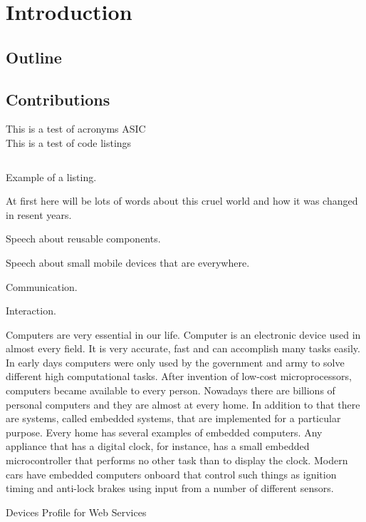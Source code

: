 \newpage
\section{Introduction}
\subsection{Outline}
\subsection{Contributions}



This is a test of acronyms  \gls{ASIC} \\

This is a test of code listings
\begin{listing}[H]
	\inputminted[linenos=true,
	fistline=32,
	firstnumber=32,
	lastline=60]{java}{../source/CoffeeMachineViaBlueTooth.java}
	\caption{Example of a listing.}
	\label{lst:example}
\end{listing}


At first here will be lots of words about this cruel world and how it was
changed in resent years.

Speech about reusable components.

Speech about small mobile devices that are everywhere.



Communication.

Interaction.





Computers are very essential in our life. Computer is an electronic device
used in almost every field. It is very accurate, fast and can accomplish
many tasks easily. In early days computers were only used by the government
and army to solve different high computational tasks. After invention of
low-cost microprocessors, computers became available to every person. Nowadays  
there are billions of personal computers and they are almost at every home. In
addition to that there are systems, called embedded systems, that are
implemented for a particular purpose.
Every home has several examples of embedded computers.
Any appliance that has a digital clock, for instance, has a small embedded microcontroller that performs no other task than to display the clock.
Modern cars have embedded computers onboard that control such things as ignition timing and anti-lock brakes using input from a number of different sensors.






Devices Profile for Web Services

